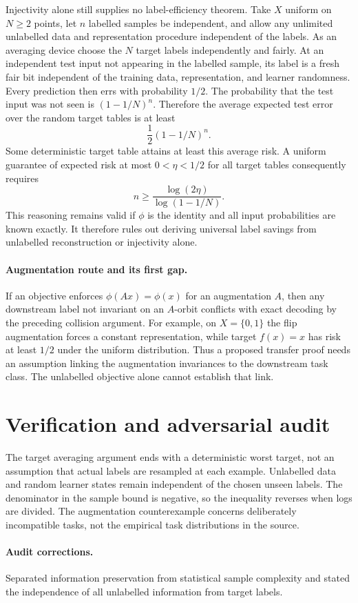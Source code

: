 \documentclass[11pt]{article}
\begin{document}
Injectivity alone still supplies no label-efficiency theorem. Take $X$ uniform on $N\geq2$ points, let $n$ labelled samples be independent, and allow any unlimited unlabelled data and representation procedure independent of the labels. As an averaging device choose the $N$ target labels independently and fairly. At an independent test input not appearing in the labelled sample, its label is a fresh fair bit independent of the training data, representation, and learner randomness. Every prediction then errs with probability $1/2$. The probability that the test input was not seen is $(1-1/N)^n$. Therefore the average expected test error over the random target tables is at least
\[
\frac12(1-1/N)^n.
\]
Some deterministic target table attains at least this average risk. A uniform guarantee of expected risk at most $0<\eta<1/2$ for all target tables consequently requires
\[
n\geq \frac{\log(2\eta)}{\log(1-1/N)}.
\]
This reasoning remains valid if $\phi$ is the identity and all input probabilities are known exactly. It therefore rules out deriving universal label savings from unlabelled reconstruction or injectivity alone.

\paragraph{Augmentation route and its first gap.}
If an objective enforces $\phi(Ax)=\phi(x)$ for an augmentation $A$, then any downstream label not invariant on an $A$-orbit conflicts with exact decoding by the preceding collision argument. For example, on $X=\{0,1\}$ the flip augmentation forces a constant representation, while target $f(x)=x$ has risk at least $1/2$ under the uniform distribution. Thus a proposed transfer proof needs an assumption linking the augmentation invariances to the downstream task class. The unlabelled objective alone cannot establish that link.
\section{Verification and adversarial audit}
The target averaging argument ends with a deterministic worst target, not an assumption that actual labels are resampled at each example. Unlabelled data and random learner states remain independent of the chosen unseen labels. The denominator in the sample bound is negative, so the inequality reverses when logs are divided. The augmentation counterexample concerns deliberately incompatible tasks, not the empirical task distributions in the source.
\paragraph{Audit corrections.} Separated information preservation from statistical sample complexity and stated the independence of all unlabelled information from target labels.
\end{document}
